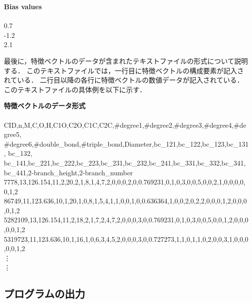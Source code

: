 \documentclass[11pt, titlepage, dvipdfmx, twoside]{article}
\begin{document}
\bigskip

\begin{oframed}
{\bf Bias values}\\\\
0.7\\
-1.2\\
2.1\\
\end{oframed}

\bigskip

最後に，特徴ベクトルのデータが含まれたテキストファイルの形式について説明する．
このテキストファイルでは，一行目に特徴ベクトルの構成要素が記入されている．
二行目以降の各行に特徴ベクトルの数値データが記入されている．
このテキストファイルの具体例を以下に示す．

\bigskip

\begin{oframed}
{\bf 特徴ベクトルのデータ形式}\\\\
CID,n,M,C,O,H,C1O,C2O,C1C,C2C,\#degree1,\#degree2,\#degree3,\#degree4,\#degree5,\\
\#degree6,\#double\_bond,\#triple\_bond,Diameter,bc\_121,bc\_122,bc\_123,bc\_131,
bc\_132, \\bc\_141,bc\_221,bc\_222,bc\_223,bc\_231,bc\_232,bc\_241,bc\_331,bc\_332,bc\_341,bc\_441,2-branch\_height,2-branch\_number\\
7778,13,126.154,11,2,20,2,1,8,1,4,7,2,0,0,0,2,0,0.769231,0,1,0,3,0,0,5,0,0,2,1,0,0,0,0,0,1,2
\\
86749,11,123.636,10,1,20,1,0,8,1,5,4,1,1,0,0,1,0,0.636364,1,0,0,2,0,2,2,0,0,0,1,2,0,0,0,0,1,2
\\
5282109,13,126.154,11,2,18,2,1,7,2,4,7,2,0,0,0,3,0,0.769231,0,1,0,3,0,0,5,0,0,1,2,0,0,0,0,0,1,2
\\
5319723,11,123.636,10,1,16,1,0,6,3,4,5,2,0,0,0,3,0,0.727273,1,1,0,1,1,0,2,0,0,3,1,0,0,0,0,0,1,2
\\
\hspace{5mm}\vdots
\\
\hspace{5mm}\vdots

\end{oframed}

\bigskip



\subsection{プログラムの出力}
\label{sec:section3_3}
\end{document}

